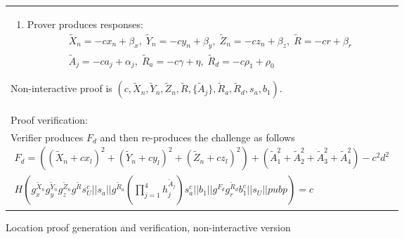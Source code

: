 \documentclass{article}
\begin{document}
\begin{figure}[!htb]
\begin{tabular}{|p{\linewidth}|}
\begin{enumerate}
\item
  Prover produces responses:
\begin{multline}
  \tilde X_n = -c x_n + \beta_x,  \;
  \tilde Y_n = -c y_n + \beta_y,  \;
  \tilde Z_n = -c z_n + \beta_z,   \;
  \tilde R = -c r + \beta_r   \\
  \tilde A_j = -c a_j + \alpha_j, \;
  \tilde R_a = -c \gamma + \eta,   \;
  \tilde R_d = -c \rho_1 + \rho_0
\end{multline}
\end{enumerate}
Non-interactive proof is
$(c, \tilde X_n, \tilde Y_n, \tilde Z_n, \tilde R, \{\tilde A_j\}, \tilde R_a, \tilde R_d, s_a, b_1)$.
\\
Proof verification:\\
Verifier produces $F_d$ and then re-produces the challenge as follows
%
\begin{multline}
\label{verf-chash}
  F_d = ((\tilde X_n + c x_l)^2 + (\tilde Y_n + c y_l)^2 + (\tilde Z_n + c z_l)^2) + (\tilde A_1^2 + \tilde A_2^2 + \tilde A_3^2 + \tilde A_4^2) - c^2 d^2 \\
  H(g_x^{\tilde X_n} g_y^{\tilde Y_n} g_z^{\tilde Z_n} g^{\tilde R} s_U^{c} ||
    s_a ||
    g^{\tilde R_a} (\prod_{j=1}^4 h_j^{\tilde A_j}) s_a^{c} ||
    b_1 ||
    g^{F_d} g_r^{\tilde R_d} b_1^c ||
    s_U ||
    pubp)
  = c
\end{multline}
\\
\hline
\end{tabular}
\caption{Location proof generation and verification, non-interactive version}
\label{ni_fig}
\end{figure}
\end{document}
